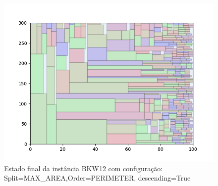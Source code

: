 \begin{figure}[H]
    \centering
    \caption[]{Estado final da instância BKW12 com configuração: Split=MAX_AREA,Order=PERIMETER, descending=True}
    \label{fig:bkw12-max_area-perimeter-true}
    \includegraphics[scale=0.5]{output/figures/bkw/bkw12/max_area/perimeter/true/000}
\end{figure}